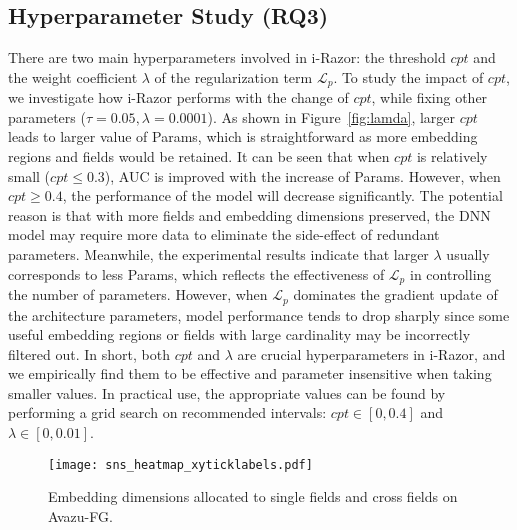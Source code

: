 \documentclass[10pt,journal,compsoc]{IEEEtran}
\begin{document}
\subsection{Hyperparameter Study (RQ3)}
There are two main hyperparameters involved in i-Razor: the threshold $cpt$ and the weight coefficient $\lambda$ of the regularization term $\mathcal{L}_p$. 
To study the impact of $cpt$, we investigate how i-Razor performs with the change of $cpt$, while fixing other parameters ($\tau=0.05, \lambda=0.0001$). As shown in Figure~\ref{fig:lamda}, larger $cpt$ leads to larger value of Params, which is straightforward as more embedding regions and fields would be retained. %
It can be seen that when $cpt$ is relatively small ($cpt \leq 0.3$), AUC is improved with the increase of Params. However, when $cpt\geq 0.4$, the performance of the model will decrease significantly.
The potential reason is that with more fields and embedding dimensions preserved, the DNN model may require more data to eliminate the side-effect of redundant parameters. 
Meanwhile, the experimental results indicate that larger $\lambda$ usually corresponds to less Params, which reflects the effectiveness of $\mathcal{L}_p$ in controlling the number of parameters.
However, when $\mathcal{L}_p$ dominates the gradient update of the architecture parameters, model performance tends to drop sharply since some useful embedding regions or fields with large cardinality may be incorrectly filtered out.
In short, both $cpt$ and $\lambda$ are crucial hyperparameters in i-Razor, and we empirically find them to be effective and parameter insensitive when taking smaller values. In practical use, the appropriate values can be found by performing a grid search on recommended intervals: $cpt \in \left[0, 0.4\right]$ and $\lambda \in \left[0, 0.01\right]$.

\begin{figure}[tbh!]
    \centering
    \texttt{[image: sns\_heatmap\_xyticklabels.pdf]}
    \caption{Embedding dimensions allocated to single fields and cross fields on Avazu-FG.}
\label{fig:dimension_visualization}
\end{figure}
\end{document}
